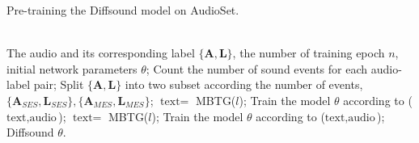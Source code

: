 \documentclass[lettersize,journal]{IEEEtran}
\begin{document}
\begin{algorithm}[t]
\caption{Pre-training the Diffsound model on AudioSet.}
\label{alg:PA3}
\begin{algorithmic}[1]
\REQUIRE ~~\\
    The audio and its corresponding label $\{\boldsymbol{A}, \boldsymbol{L}\}$, the number of training epoch $n$, initial network parameters $\theta$;
    \STATE Count the number of sound events for each audio-label pair;
    \STATE Split $\{\boldsymbol{A}, \boldsymbol{L}\}$ into two subset according the number of events, $\{\boldsymbol{A}_{SES},\boldsymbol{L}_{SES}\}, \{\boldsymbol{A}_{MES},\boldsymbol{L}_{MES}\}$;
    \STATE $\mbox{text} =$ MBTG($l$);
    \STATE Train the model $\theta$ according to ($\mbox{text},\mbox{audio}$);
    \ENDFOR
    \ENDFOR
    \STATE $\mbox{text} =$ MBTG($l$);
    \STATE Train the model $\theta$ according to ($\mbox{text},\mbox{audio}$);
    \ENDFOR
    \ENDFOR
\RETURN Diffsound $\theta$.
\end{algorithmic}
\end{algorithm}
\end{document}
